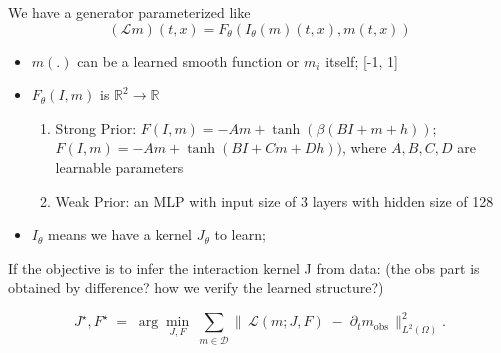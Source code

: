 \documentclass[11pt,a4paper]{article}
\begin{document}
We have a generator parameterized like
\begin{equation}
    (\mathcal{L}m)(t,x) = F_\theta(I_\theta (m)(t,x), m(t,x))
\end{equation}

\begin{itemize}
    \item $m(.)$ can be a learned smooth function or $m_i$ itself; [-1, 1]
    \item $F_\theta(I,m)$ is $\mathbb{R}^2 \to \mathbb{R}$
    \begin{enumerate}
        \item Strong Prior: $F(I, m)=-Am+\tanh(\beta(BI+m+h))$; $F(I, m)=-Am+\tanh(BI+Cm+Dh))$, where $A,B,C,D$ are learnable parameters
        \item Weak Prior: an MLP with input size of 3 layers with hidden size of 128
    \end{enumerate}
    \item $I_\theta$ means we have a kernel $J_\theta$ to learn;
\end{itemize}


If the objective is to infer the interaction kernel J from data: 
(the obs part is obtained by difference? how we verify the learned structure?)

$$
J^\star, F^\star \;=\; \arg\min_{J, F}\;
\sum_{m \in \mathcal{D}}
\bigl\|\, \mathcal{L}(m;J,F)\;-\;\partial_t m_{\mathrm{obs}} \,\bigr\|_{L^2(\Omega)}^{2}.
$$
\end{document}
